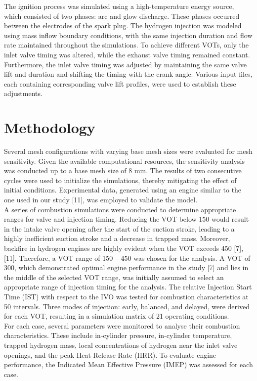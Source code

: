 \documentclass[conference]{IEEEtran}
\begin{document}
The ignition process was simulated using a high-temperature energy source, which consisted of two phases: arc and glow discharge. These phases occurred between the electrodes of the spark plug. The hydrogen injection was modeled using mass inflow boundary conditions, with the same injection duration and flow rate maintained throughout the simulations. To achieve different VOTs, only the inlet valve timing was altered, while the exhaust valve timing remained constant. Furthermore, the inlet valve timing was adjusted by maintaining the same valve lift and duration and shifting the timing with the crank angle. Various input files, each containing corresponding valve lift profiles, were used to establish these adjustments.


\section{Methodology}

Several mesh configurations with varying base mesh sizes were evaluated for mesh sensitivity. Given the available computational resources, the sensitivity analysis was conducted up to a base mesh size of 8 mm. The results of two consecutive cycles were used to initialize the simulations, thereby mitigating the effect of initial conditions. Experimental data, generated using an engine similar to the one used in our study [11], was employed to validate the model.\\

A series of combustion simulations were conducted to determine appropriate ranges for valve and injection timing. Reducing the VOT below 150 would result in the intake valve opening after the start of the suction stroke, leading to a highly inefficient suction stroke and a decrease in trapped mass. Moreover, backfire in hydrogen engines are highly evident when the VOT exceeds 450 [7], [11]. Therefore, a VOT range of 150 – 450 was chosen for the analysis. A VOT of 300, which demonstrated optimal engine performance in the study [7] and lies in the middle of the selected VOT range, was initially assumed to select an appropriate range of injection timing for the analysis. The relative Injection Start Time (IST) with respect to the IVO was tested for combustion characteristics at 50 intervals. Three modes of injection: early, balanced, and delayed, were derived for each VOT, resulting in a simulation matrix of 21 operating conditions.\\

For each case, several parameters were monitored to analyse their combustion characteristics. These include in-cylinder pressure, in-cylinder temperature, trapped hydrogen mass, local concentrations of hydrogen near the inlet valve openings, and the peak Heat Release Rate (HRR). To evaluate engine performance, the Indicated Mean Effective Pressure (IMEP) was assessed for each case.
\end{document}

